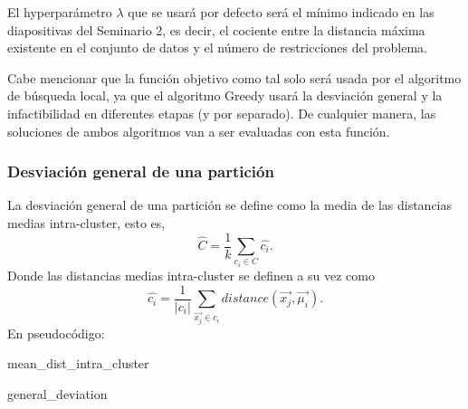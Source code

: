 \documentclass[11pt,a4paper]{article}
\begin{document}
	El hyperparámetro $\lambda$ que se usará por defecto será el mínimo indicado en las diapositivas del Seminario 2, es decir, el cociente entre la distancia máxima existente en el conjunto de datos y el número de restricciones del problema. 
	
	Cabe mencionar que la función objetivo como tal solo será usada por el algoritmo de búsqueda local, ya que el algoritmo Greedy usará la desviación general y la infactibilidad en diferentes etapas (y por separado). De cualquier manera, las soluciones de ambos algoritmos van a ser evaluadas con esta función.
	\subsubsection{Desviación general de una partición}
	La desviación general de una partición se define como la media de las distancias medias intra-cluster, esto es,
	$$\hat{C} = \frac{1}{k} \sum_{c_i \in C} \hat{c_i}.$$ Donde las distancias medias intra-cluster se definen a su vez como $$\hat{c_i} = \frac{1}{|c_i|} \sum_{\vec{x_j} \in c_i}distance(\vec{x_j}, \vec{\mu_i}).$$ En pseudocódigo:
	
    \begin{algorithm}
	 	\caption{mean\_dist\_intra\_cluster}
	\end{algorithm}
	\begin{algorithm}
	 	\caption{general\_deviation}
	\end{algorithm}
	
\end{document}
